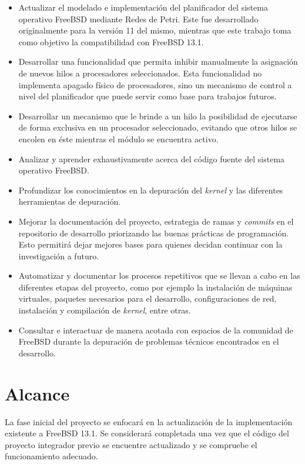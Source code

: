\begin{itemize}
    \item Actualizar el modelado e implementación del planificador del sistema operativo FreeBSD mediante Redes de Petri. Este fue desarrollado originalmente para la versión 11 del mismo, mientras que este trabajo toma como objetivo la compatibilidad con FreeBSD 13.1.
    \item Desarrollar una funcionalidad que permita inhibir manualmente la asignación de nuevos hilos a procesadores seleccionados. Esta funcionalidad no implementa apagado físico de procesadores, sino un mecanismo de control a nivel del planificador que puede servir como base para trabajos futuros.
    \item Desarrollar un mecanismo que le brinde a un hilo la posibilidad de ejecutarse de forma exclusiva en un procesador seleccionado, evitando que otros hilos se encolen en éste mientras el módulo se encuentra activo.
    \item Analizar y aprender exhaustivamente acerca del código fuente del sistema operativo FreeBSD.\@
    \item Profundizar los conocimientos en la depuración del \textit{kernel} y las diferentes herramientas de depuración.
    \item Mejorar la documentación del proyecto, estrategia de ramas y \textit{commits} en el repositorio de desarrollo priorizando las buenas prácticas de programación. Esto permitirá dejar mejores bases para quienes decidan continuar con la investigación a futuro.
    \item Automatizar y documentar los procesos repetitivos que se llevan a cabo en las diferentes etapas del proyecto, como por ejemplo la instalación de máquinas virtuales, paquetes necesarios para el desarrollo, configuraciones de red, instalación y compilación de \textit{kernel}, entre otras.
    \item Consultar e interactuar de manera acotada con espacios de la comunidad de FreeBSD durante la depuración de problemas técnicos encontrados en el desarrollo.
\end{itemize}

\section{Alcance}

La fase inicial del proyecto se enfocará en la actualización de la implementación existente a FreeBSD 13.1. Se considerará completada una vez que el código del proyecto integrador previo se encuentre actualizado y se compruebe el funcionamiento adecuado.\par

